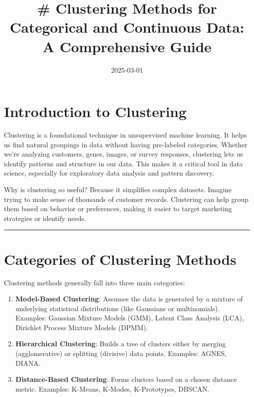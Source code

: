 \documentclass[
  letterpaper,
  DIV=11,
  numbers=noendperiod]{scrartcl}
\title{\# Clustering Methods for Categorical and Continuous Data: A
Comprehensive Guide}
\author{}
\date{2025-03-01}
\providecommand{\tightlist}{%
  \setlength{\itemsep}{0pt}\setlength{\parskip}{0pt}}\usepackage{longtable,booktabs,array}
\renewcommand*\contentsname{Table of contents}
\newcommand\contentsname{Table of contents}
\begin{document}
\maketitle
\renewcommand*\contentsname{Table of contents}
{
\hypersetup{linkcolor=}
\setcounter{tocdepth}{3}
\tableofcontents
}
\section{Introduction to Clustering}\label{introduction-to-clustering}

Clustering is a foundational technique in unsupervised machine learning.
It helps us find natural groupings in data without having pre-labeled
categories. Whether we're analyzing customers, genes, images, or survey
responses, clustering lets us identify patterns and structure in our
data. This makes it a critical tool in data science, especially for
exploratory data analysis and pattern discovery.

Why is clustering so useful? Because it simplifies complex datasets.
Imagine trying to make sense of thousands of customer records.
Clustering can help group them based on behavior or preferences, making
it easier to target marketing strategies or identify needs.

\begin{center}\rule{0.5\linewidth}{0.5pt}\end{center}

\section{Categories of Clustering
Methods}\label{categories-of-clustering-methods}

Clustering methods generally fall into three main categories:

\begin{enumerate}
\def\labelenumi{\arabic{enumi}.}
\tightlist
\item
  \textbf{Model-Based Clustering}: Assumes the data is generated by a
  mixture of underlying statistical distributions (like Gaussians or
  multinomials). Examples: Gaussian Mixture Models (GMM), Latent Class
  Analysis (LCA), Dirichlet Process Mixture Models (DPMM).
\item
  \textbf{Hierarchical Clustering}: Builds a tree of clusters either by
  merging (agglomerative) or splitting (divisive) data points. Examples:
  AGNES, DIANA.
\item
  \textbf{Distance-Based Clustering}: Forms clusters based on a chosen
  distance metric. Examples: K-Means, K-Modes, K-Prototypes, DBSCAN.
\end{enumerate}
\end{document}
